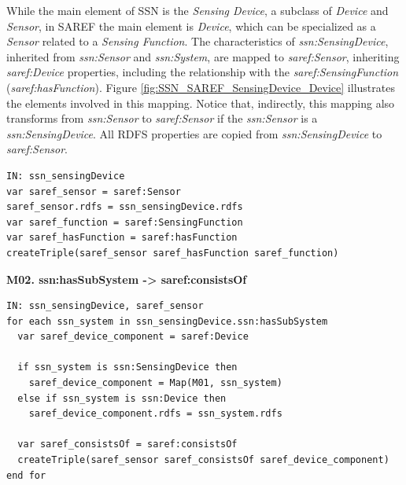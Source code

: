 \documentclass{sig-alternate-05-2015}
\begin{document}
\noindent
While the main element of SSN is the \textit{Sensing Device}, a subclass of \textit{Device} and \textit{Sensor}, in SAREF the main element is \textit{Device}, which can be specialized as a \textit{Sensor} related to a \textit{Sensing Function}. The characteristics of \textit{ssn:\-SensingDevice}, inherited from \textit{ssn:\-Sensor} and \textit{ssn:\-System}, are mapped to \textit{saref:\-Sensor}, inheriting \textit{saref:\-Device} properties, including the relationship with the \textit{saref:\-SensingFunction} (\textit{saref:\-hasFunction}). Figure \ref{fig:SSN_SAREF_SensingDevice_Device} illustrates the elements involved in this mapping. Notice that, indirectly, this mapping also transforms from \textit{ssn:\-Sensor} to \textit{saref:\-Sensor} if the \textit{ssn:\-Sensor} is a \textit{ssn:\-SensingDevice}. All RDFS properties are copied from \textit{ssn:\-SensingDevice} to \textit{saref:\-Sensor}. 

\begin{lstlisting}[caption={Pseudocode snippet for M01},label={code:sample},captionpos=b]
IN: ssn_sensingDevice
var saref_sensor = saref:Sensor  
saref_sensor.rdfs = ssn_sensingDevice.rdfs    
var saref_function = saref:SensingFunction  
var saref_hasFunction = saref:hasFunction  
createTriple(saref_sensor saref_hasFunction saref_function)

\end{lstlisting}

\noindent
\newline
\textbf{M02. ssn:\-hasSubSystem -> saref:\-consistsOf}

\begin{lstlisting}[caption={Pseudocode snippet for M02},label={code:sample},captionpos=b]
IN: ssn_sensingDevice, saref_sensor
for each ssn_system in ssn_sensingDevice.ssn:hasSubSystem 
  var saref_device_component = saref:Device 
  
  if ssn_system is ssn:SensingDevice then
    saref_device_component = Map(M01, ssn_system) 
  else if ssn_system is ssn:Device then 
    saref_device_component.rdfs = ssn_system.rdfs 
   
  var saref_consistsOf = saref:consistsOf 
  createTriple(saref_sensor saref_consistsOf saref_device_component)
end for
\end{lstlisting}
\end{document}
